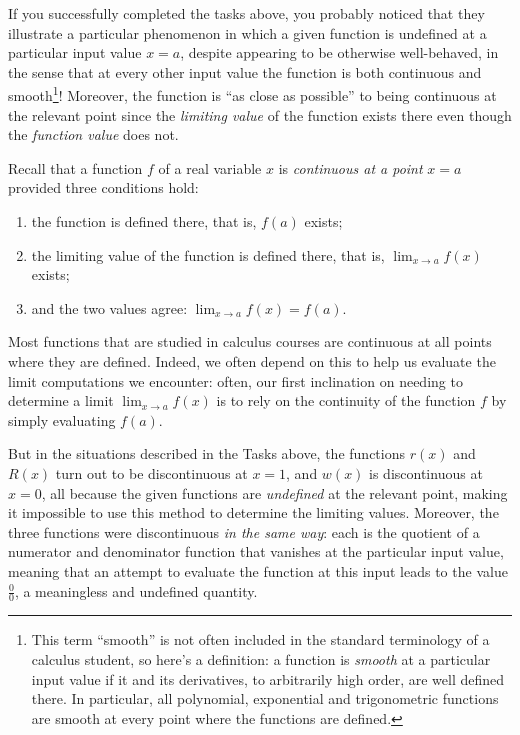 \message{ !name(LHopitalsRule_2021.03.29.tex)}\documentclass[11pt]{article}
\begin{document}
\bigskip
If you successfully completed the tasks above, you probably noticed that they illustrate a particular phenomenon in which a given function is undefined at a particular input value $x=a$, despite appearing to be otherwise well-behaved, in the sense that at every other input value the function is both continuous and smooth\footnote{This term ``smooth'' is not often included in the standard terminology of a calculus student, so here's a definition: a function is \emph{smooth} at a particular input value if it and its derivatives, to arbitrarily high order, are well defined there. In particular, all polynomial, exponential and trigonometric functions are smooth at every point where the functions are defined.}! Moreover, the function is ``as close as possible'' to being continuous at the relevant point since the \emph{limiting value} of the function exists there even though the \emph{function value} does not.

Recall that a function $f$ of a real variable $x$ is \emph{continuous at a point} $x=a$ provided three conditions hold:
\begin{enumerate} \itemsep -3pt
\item the function is defined there, that is, $f(a)$ exists;
\item the limiting value of the function is defined there, that is, ${\displaystyle\lim_{x\rightarrow a} f(x)}$ exists;
\item and the two values agree: ${\displaystyle\lim_{x\rightarrow a} f(x)=f(a).}$
\end{enumerate}
Most functions that are studied in calculus courses are continuous at all points where they are defined. Indeed, we often depend on this to help us evaluate the limit computations we encounter: often, our first inclination on needing to determine a limit ${\displaystyle \lim_{x\rightarrow a} f(x)}$ is to rely on the continuity of the function $f$ by simply evaluating $f(a)$.

But in the situations described in the Tasks above, the functions $r(x)$ and $R(x)$ turn out to be discontinuous at $x=1$, and $w(x)$ is discontinuous at $x=0$, all because the given functions are \emph{undefined} at the relevant point, making it impossible to use this method to determine the limiting values. Moreover, the three functions were discontinuous \emph{in the same way}: each is the quotient of a numerator and denominator function that vanishes at the particular input value, meaning that an attempt to evaluate the function at this input leads to the value $\frac00$, a meaningless and undefined quantity.
\end{document}
